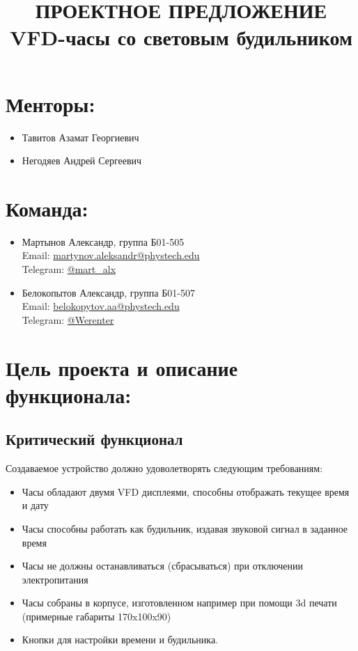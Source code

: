 \documentclass[a4paper,14pt]{extarticle}
\title{\huge \textbf{ПРОЕКТНОЕ ПРЕДЛОЖЕНИЕ}\\\large VFD-часы со световым будильником}
\date{}
\begin{document}
\maketitle

\section{Менторы:}

\begin{itemize}
	\item Тавитов Азамат Георгиевич
	\item Негодяев Андрей Сергеевич
\end{itemize}


\section{Команда:}

\begin{itemize}
	\item Мартынов Александр, группа Б01-505\\
	Email:
	\href{mailto:martynov.aleksandr@phystech.edu}{martynov.aleksandr@phystech.edu}\\
	Telegram:
	\href{https://t.me/mart_alx}{@mart\_alx}

	\item Белокопытов Александр, группа Б01-507\\
	Email:
	\href{mailto:belokopytov.aa@phystech.edu}{belokopytov.aa@phystech.edu}\\
	Telegram:
	\href{https://t.me/Werenter}{@Werenter}	
\end{itemize}

\section{Цель проекта и описание функционала:}

\subsection{Критический функционал}

Создаваемое устройство должно удоволетворять следующим требованиям:
\begin{itemize}
	\item
		Часы обладают двумя VFD дисплеями, способны отображать
		текущее время и дату
	\item
		Часы способны работать как будильник,
		издавая звуковой сигнал в заданное время
	\item
		Часы не должны останавливаться (сбрасываться)
		при отключении электропитания
	\item
		Часы собраны в корпусе, изготовленном например при
		помощи 3d печати (примерные габариты 170x100x90)
	\item
		Кнопки для настройки времени и будильника.
\end{itemize}
\end{document}
